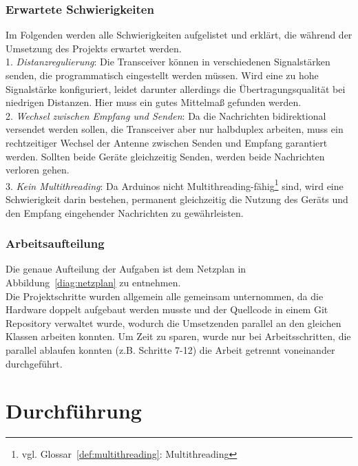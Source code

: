 \documentclass[a4paper, 11pt]{scrartcl}
\begin{document}
\subsubsection{Erwartete Schwierigkeiten}\label{ch:hard_stuff_expected}
Im Folgenden werden alle Schwierigkeiten aufgelistet und erklärt, die während der Umsetzung des Projekts erwartet werden.
\\
1. \textit{Distanzregulierung}: Die Transceiver können in verschiedenen Signalstärken senden, die programmatisch eingestellt werden müssen.
Wird eine zu hohe Signalstärke konfiguriert, leidet darunter allerdings die Übertragungsqualität bei niedrigen Distanzen. Hier muss ein gutes Mittelmaß
gefunden werden.
\\
2. \textit{Wechsel zwischen Empfang und Senden}: Da die Nachrichten bidirektional versendet werden sollen, die Transceiver aber nur halbduplex arbeiten,
muss ein rechtzeitiger Wechsel der Antenne zwischen Senden und Empfang garantiert werden. Sollten beide Geräte gleichzeitig Senden, werden beide Nachrichten
verloren gehen.
\\
3. \textit{Kein Multithreading}: Da Arduinos nicht Multithreading-fähig\footnote{vgl. Glossar~\ref{def:multithreading}: Multithreading} sind, wird eine Schwierigkeit
darin bestehen, permanent gleichzeitig die Nutzung des Geräts und den Empfang eingehender Nachrichten zu gewährleisten.\label{itm:thread}

\subsubsection{Arbeitsaufteilung}
Die genaue Aufteilung der Aufgaben ist dem Netzplan in Abbildung~\ref{diag:netzplan} zu entnehmen.
\\
Die Projektschritte wurden allgemein alle gemeinsam unternommen, da die Hardware doppelt aufgebaut werden musste und der Quellcode in einem Git Repository verwaltet wurde,
wodurch die Umsetzenden parallel an den gleichen Klassen arbeiten konnten. Um Zeit zu sparen, wurde nur bei Arbeitsschritten, die parallel ablaufen konnten (z.B. Schritte 7-12) die Arbeit getrennt voneinander durchgeführt.

\section{Durchführung}
\end{document}
